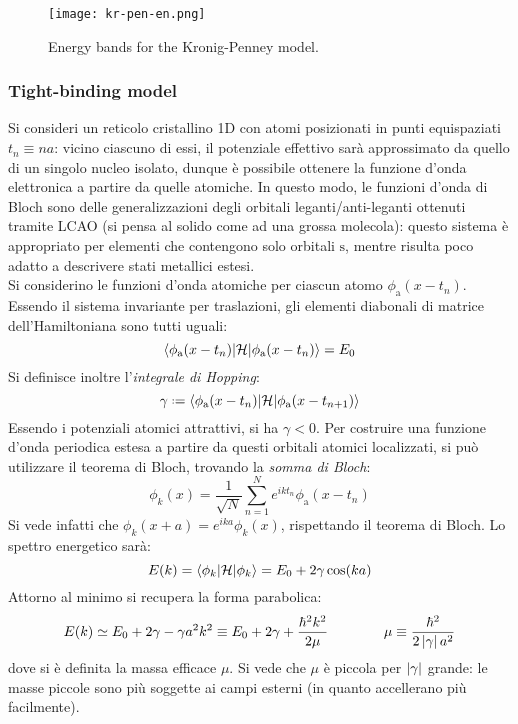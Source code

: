 \begin{figure}
	\centering
	\texttt{[image: kr-pen-en.png]}
	\caption{Energy bands for the Kronig-Penney model.}
	\label{kr-pen-en}
\end{figure}

\subsubsection{Tight-binding model}

Si consideri un reticolo cristallino 1D con atomi posizionati in punti equispaziati $ t_n \equiv na $: vicino ciascuno di essi, il potenziale effettivo sarà approssimato da quello di un singolo nucleo isolato, dunque è possibile ottenere la funzione d'onda elettronica a partire da quelle atomiche. In questo modo, le funzioni d'onda di Bloch sono delle generalizzazioni degli orbitali leganti/anti-leganti ottenuti tramite LCAO (si pensa al solido come ad una grossa molecola): questo sistema è appropriato per elementi che contengono solo orbitali $ \text{s} $, mentre risulta poco adatto a descrivere stati metallici estesi. \\
Si considerino le funzioni d'onda atomiche per ciascun atomo $ \phi_\text{a}(x-t_n) $. Essendo il sistema invariante per traslazioni, gli elementi diabonali di matrice dell'Hamiltoniana sono tutti uguali:
\begin{equation}
	\braket{\phi_\text{a}(x-t_n) | \mathcal{H} | \phi_\text{a}(x-t_n)} = E_0
\end{equation}
Si definisce inoltre l'\textit{integrale di Hopping}:
\begin{equation}
	\gamma \defeq \braket{\phi_\text{a}(x-t_n) | \mathcal{H} | \phi_\text{a}(x-t_{n+1})}
\end{equation}
Essendo i potenziali atomici attrattivi, si ha $ \gamma < 0 $. Per costruire una funzione d'onda periodica estesa a partire da questi orbitali atomici localizzati, si può utilizzare il teorema di Bloch, trovando la \textit{somma di Bloch}:
\begin{equation}
	\phi_k(x) = \frac{1}{\sqrt{N}} \sum_{n = 1}^N e^{i k t_n} \phi_\text{a}(x-t_n)
\end{equation}
Si vede infatti che $ \phi_k(x+a) = e^{ika} \phi_k(x) $, rispettando il teorema di Bloch. Lo spettro energetico sarà:
\begin{equation}
	E(k) = \braket{\phi_k | \mathcal{H} | \phi_k} = E_0 + 2 \gamma \cos(ka)
\end{equation}
Attorno al minimo si recupera la forma parabolica:
\begin{equation}
	E(k) \simeq E_0 + 2\gamma - \gamma a^2 k^2 \equiv E_0 + 2\gamma + \frac{\hbar^2 k^2}{2\mu}
	\qquad \qquad
	\mu \equiv \frac{\hbar^2}{2 \left\lvert\gamma\right\rvert a^2}
\end{equation}
dove si è definita la massa efficace $ \mu $. Si vede che $ \mu $ è piccola per $ \left\lvert\gamma\right\rvert $ grande: le masse piccole sono più soggette ai campi esterni (in quanto accellerano più facilmente).

